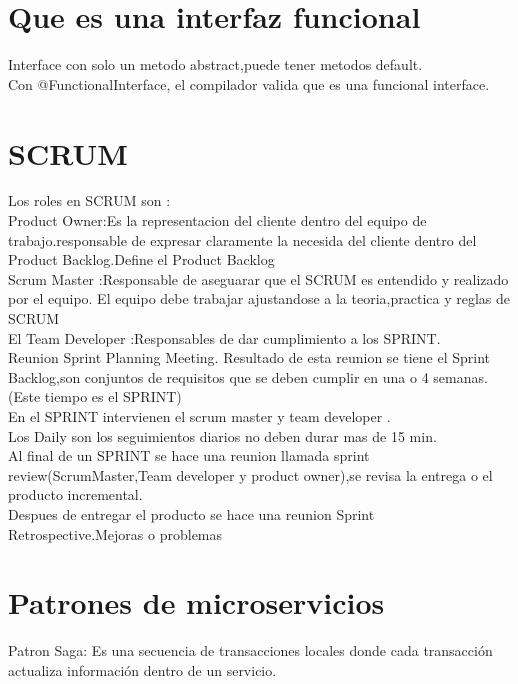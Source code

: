 \section{Que es una interfaz funcional}
Interface con solo un metodo abstract,puede tener metodos default.\\
Con @FunctionalInterface, el compilador valida que es una funcional interface.
\section{SCRUM}
Los roles en SCRUM son :\\
 Product Owner:Es la representacion del cliente dentro del equipo de trabajo.responsable de expresar
 claramente la necesida del cliente dentro del Product Backlog.Define el Product Backlog\\
Scrum Master :Responsable de aseguarar que el SCRUM es entendido y realizado por el equipo.
El equipo debe trabajar ajustandose a la teoria,practica y reglas de SCRUM\\
El Team Developer :Responsables de dar cumplimiento a los SPRINT.\\
Reunion Sprint Planning Meeting.
Resultado de esta reunion se tiene el Sprint Backlog,son conjuntos de requisitos que se deben cumplir en una o 4 semanas.(Este tiempo es el SPRINT)\\
En el SPRINT intervienen el scrum master y team developer .\\
Los Daily son los seguimientos diarios no deben durar mas de 15 min.\\
Al final de un SPRINT se hace una reunion llamada sprint review(ScrumMaster,Team developer y product owner),se revisa la entrega o el producto incremental.\\
 Despues de entregar el producto se hace una reunion Sprint Retrospective.Mejoras o problemas\\
 \section{Patrones de microservicios}
 Patron Saga: Es una secuencia de transacciones locales donde cada transacci\'on  actualiza informaci\'on 
 dentro de un servicio.
